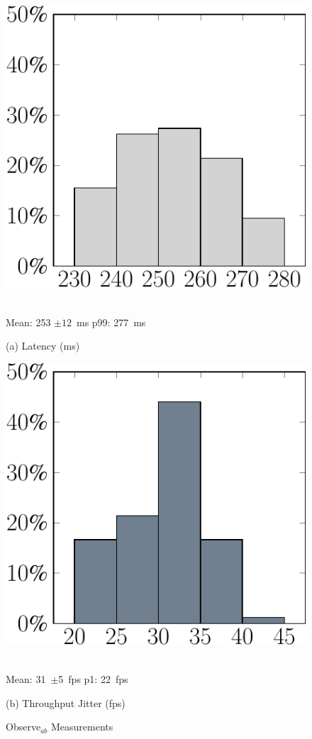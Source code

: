 \begin{figure}
\centering

\begin{minipage}[b]{.49\linewidth}
\centering
\includegraphics[width=0.8\linewidth]{chapter5/FIGS/histo-observeab-latency.pdf}
\begin{captext}
\centering
\\[0.1cm] Mean: 253 $\pm 12$~ms\; p99: 277~ms\\
\end{captext}
\vspace{-0.05in}
{\small (a) Latency (ms)}
\end{minipage}
\begin{minipage}[b]{.49\linewidth}
\centering
\includegraphics[width=0.8\linewidth]{chapter5/FIGS/histo-observeab-throughput.pdf}
\begin{captext}
\centering
\\[0.1cm] Mean: 31~$\pm$5~fps\; p1: 22~fps\\
\end{captext}
\vspace{-0.05in}
{\small (b) Throughput Jitter (fps)}
\end{minipage}
\caption{Observe$_{ab}$ Measurements}
\label{fig:d2c-drone-histo}
\vspace{-0.1in}
\end{figure}

